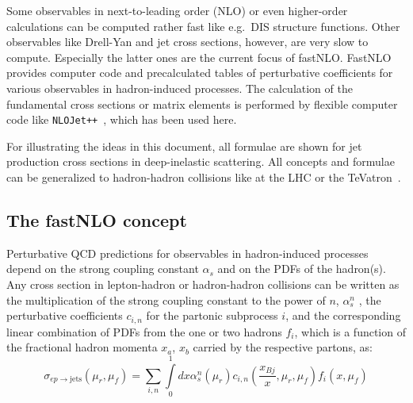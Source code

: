 \documentclass{DISproc}
\begin{document}
Some observables in next-to-leading order (NLO) or even higher-order
calculations can be computed rather fast like e.g.\ DIS structure
functions.  Other observables like Drell-Yan and jet cross sections,
however, are very slow to compute. Especially the latter ones are the
current focus of fastNLO\@. FastNLO provides computer code and
precalculated tables of perturbative coefficients for various
observables in hadron-induced processes.
The calculation of the fundamental cross sections or matrix elements is
performed by flexible computer code like
\texttt{NLOJet++}~\cite{Nagy:1998bb,Nagy:2001xb,Nagy:2001fj,Nagy:2003tz},
which has been used here.

For illustrating the ideas in this document, all formulae are shown for
jet production cross sections in deep-inelastic scattering.
All concepts and formulae can be generalized to
hadron-hadron collisions like at the LHC or the TeVatron~\cite{Kluge:2006xs}.


\subsection{The fastNLO concept}

Perturbative QCD predictions for observables in hadron-induced
processes depend on the strong coupling constant $\alpha_s$ and on the
PDFs of the hadron(s). Any cross section in lepton-hadron or
hadron-hadron collisions can be written as the multiplication of the
strong coupling constant to the power of $n$, $\alpha_s^n$ , the
perturbative coefficients $c_{i,n}$ for the partonic subprocess $i$,
and the corresponding linear combination of PDFs from the one or two
hadrons $f_i$, which is a function of the fractional hadron momenta
$x_a$, $x_b$ carried by the respective partons, as:
\begin{equation}\label{eq:CrossSection}
  \sigma_{ep\rightarrow\mathrm{jets}}(\mu_r,\mu_f) =
  \sum\limits_{i,n}\int\limits_0^1dx\alpha_s^n(\mu_r)c_{i,n}(\frac{x_{Bj}}{x},\mu_r,\mu_f)f_i(x,\mu_f)
\end{equation}
\end{document}
